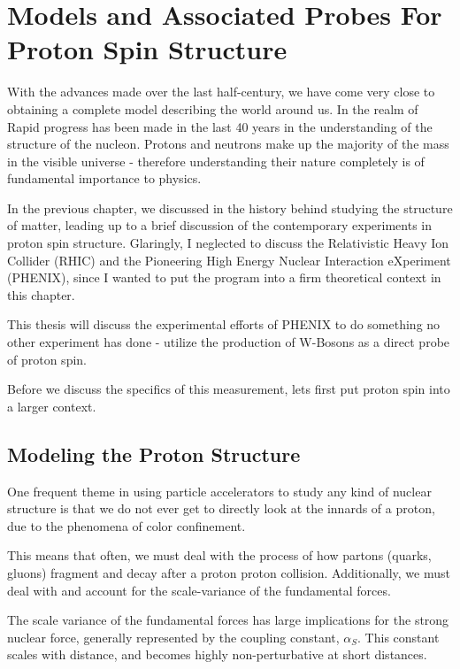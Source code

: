 \chapter{Models and Associated Probes For Proton Spin Structure}
\label{ch:modeling_proton_spin}

With the advances made over the last half-century, we have come very close to
obtaining a complete model describing the world around us.  In the realm of
Rapid progress has been made in the last 40 years in the understanding of the
structure of the nucleon. Protons and neutrons make up the majority of the mass
in the visible universe - therefore understanding their nature completely is of
fundamental importance to physics.

In the previous chapter, we discussed in the history behind studying the
structure of matter, leading up to a brief discussion of the contemporary
experiments in proton spin structure. Glaringly, I neglected to discuss the
Relativistic Heavy Ion Collider (RHIC) and the Pioneering High Energy Nuclear
Interaction eXperiment (PHENIX), since I wanted to put the program into a firm
theoretical context in this chapter.

This thesis will discuss the experimental efforts of PHENIX to do something no
other experiment has done - utilize the production of W-Bosons as a direct probe
of proton spin. 

Before we discuss the specifics of this measurement, lets first put proton spin
into a larger context.

\section{Modeling the Proton Structure}

One frequent theme in using particle accelerators to study any kind of nuclear
structure is that we do not ever get to directly look at the innards of a
proton, due to the phenomena of color confinement.

This means that often, we must deal with the process of how partons (quarks,
gluons) fragment and decay after a proton proton collision. Additionally, we
must deal with and account for the scale-variance of the fundamental forces. 

The scale variance of the fundamental forces has large implications for the
strong nuclear force, generally represented by the coupling constant,
$\alpha_S$. This constant scales with distance, and becomes highly
non-perturbative at short distances.

